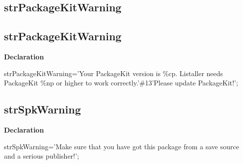 \documentclass{report}
\newif\ifpdf
\begin{document}
\subsection*{\large{\textbf{strPackageKitWarning}}\normalsize\hspace{1ex}\hrulefill}
\else
\subsection*{strPackageKitWarning}
\fi
\label{trstrings-strPackageKitWarning}
\begin{list}{}{
\setlength{\itemindent}{0cm}
\setlength{\listparindent}{0cm}
\setlength{\leftmargin}{\evensidemargin}
\addtolength{\leftmargin}{\tmplength}
\settowidth{\labelsep}{X}
\addtolength{\leftmargin}{\labelsep}
\setlength{\labelwidth}{\tmplength}
}
\item[\textbf{Declaration}\hfill]
\ifpdf
\begin{flushleft}
\fi
\begin{ttfamily}
strPackageKitWarning='Your PackageKit version is {\%}cp. Listaller needs PackageKit {\%}np or higher to work correctly.'{\#}13'Please update PackageKit!';\end{ttfamily}

\ifpdf
\end{flushleft}
\fi

\end{list}
\ifpdf
\subsection*{\large{\textbf{strSpkWarning}}\normalsize\hspace{1ex}\hrulefill}
\else
\subsection*{strSpkWarning}
\fi
\label{trstrings-strSpkWarning}
\begin{list}{}{
\setlength{\itemindent}{0cm}
\setlength{\listparindent}{0cm}
\setlength{\leftmargin}{\evensidemargin}
\addtolength{\leftmargin}{\tmplength}
\settowidth{\labelsep}{X}
\addtolength{\leftmargin}{\labelsep}
\setlength{\labelwidth}{\tmplength}
}
\item[\textbf{Declaration}\hfill]
\ifpdf
\begin{flushleft}
\fi
\begin{ttfamily}
strSpkWarning='Make sure that you have got this package from a save source and a serious publisher!';\end{ttfamily}

\ifpdf
\end{flushleft}
\fi

\end{list}
\ifpdf
\end{document}
